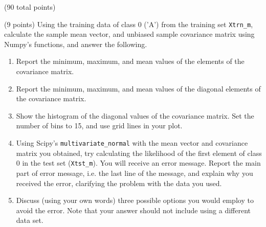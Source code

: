 \documentclass[12pt]{article}
\begin{document}
\begin{question}{(90 total points) \qTwoTitle}
\begin{subquestion}{(9 points)
    Using the training data of class 0 ('A') from the training set {\tt Xtrn\_m}, calculate the sample mean vector, and unbiased sample covariance matrix using Numpy's functions, and answer the following.
  } \label{q2:gaussian-1}
  \begin{enumerate}\NARROWITEM
  \item Report the minimum, maximum, and mean values of the elements of the covariance matrix.
  \item Report the minimum, maximum, and mean values of the diagonal elements of the covariance matrix.
  \item Show the histogram of the diagonal values of the covariance matrix. Set the number of bins to 15, and use grid lines in your plot.
  \item Using Scipy's {\tt multivariate\_normal} with the mean vector and covariance matrix you obtained, try calculating the likelihood of the first element of class 0 in the test set ({\tt Xtst\_m}). You will receive an error message. Report the main part of error message, i.e. the last line of the message, and explain why you received the error, clarifying the problem with the data you used.
  \item Discuss (using your own words) three possible options you would employ to avoid the error. Note that your answer should not include using a different data set. 
  \end{enumerate}
   


\end{subquestion}
\end{question}
\end{document}
